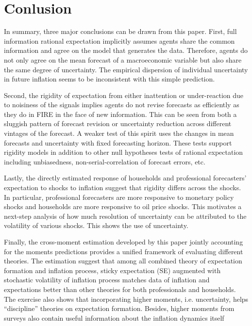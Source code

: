 \documentclass[12pt]{article}
\begin{document}
\section{Conlusion}	
	In summary, three major conclusions can be drawn from this paper.  First, full information rational expectation implicitly assumes agents share the common information and agree on the model that generates the data. Therefore, agents do not only agree on the mean forecast of a macroeconomic variable but also share the same degree of uncertainty. The empirical dispersion of individual uncertainty in future inflation seems to be inconsistent with this simple prediction. 
	
	Second, the rigidity of expectation from either inattention or under-reaction due to noisiness of the signals implies agents do not revise forecasts as efficiently as they do in FIRE in the face of new information. This can be seen from both a sluggish pattern of forecast revision or uncertainty reduction across different vintages of the forecast. A weaker test of this spirit uses the changes in mean forecasts and uncertainty with fixed forecasting horizon. These tests support rigidity models in addition to other null hypotheses tests of rational expectation including unbiasedness,  non-serial-correlation of forecast errors, etc.
	
	Lastly, the directly estimated response of households and professional forecasters' expectation to shocks to inflation suggest that rigidity differs across the shocks. In particular, professional forecasters are more responsive to monetary policy shocks and households are more responsive to oil price shocks. This motivates a next-step analysis of how much resolution of uncertainty can be attributed to the volatility of various shocks. This shows the use of uncertainty.
	
	Finally, the cross-moment estimation developed by this paper jointly accounting for the moments predictions provides a unified framework of evaluating different theories. The estimation suggest that among all combined theory of expectation formation and inflation process, sticky expectation (SE) augmented with stochastic volatility of inflation process matches data of inflation and expectations better than other theories for both professionals and households. The exercise also shows that incorporating higher moments, i.e. uncertainty,  helps ``discipline'' theories on expectation formation. Besides, higher moments from surveys also contain useful information about the inflation dynamics itself
	
	
	
	
	
\end{document}
